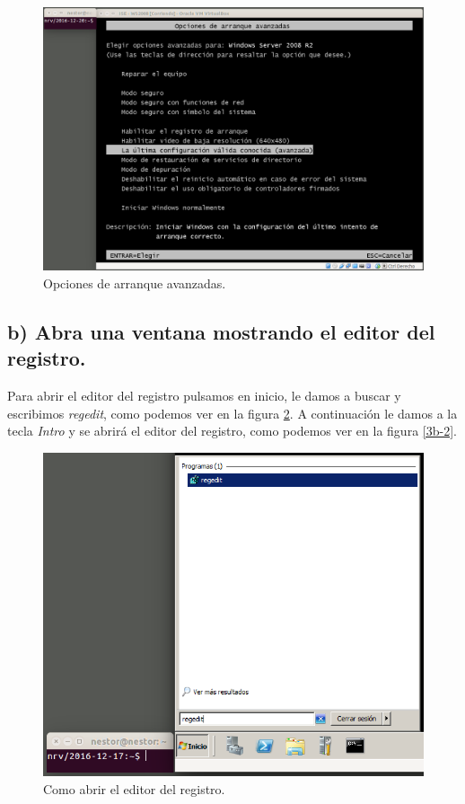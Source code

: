 \documentclass[a4paper,titlepage,12pt]{scrartcl}	%
\numberwithin{figure}{section} %
\numberwithin{table}{section} %
\begin{document}
	\begin{figure}[H]
		\includegraphics[width=\linewidth]{./Imagenes/3a-5.png}
		\vspace{-0.5cm}
		\caption[Opciones de arranque avanzadas.]{Opciones de arranque avanzadas.}
		\label{3a-5}
	\end{figure}
	
	\subsection[b) Abra una ventana mostrando el editor del registro.]{b) Abra una ventana mostrando el editor del registro.}
	
	Para abrir el editor del registro pulsamos en inicio, le damos a buscar y escribimos \textit{regedit}, como podemos ver en la figura \ref{3b-1}. A continuación le damos a la tecla \textit{Intro} y se abrirá el editor del registro, como podemos ver en la figura \ref{3b-2}.
	
	\begin{figure}[H]
		\includegraphics[width=\linewidth]{./Imagenes/3b-1.png}
		\vspace{-0.5cm}
		\caption[Como abrir el editor del registro.]{Como abrir el editor del registro.}
		\label{3b-1}
	\end{figure}
\end{document}
